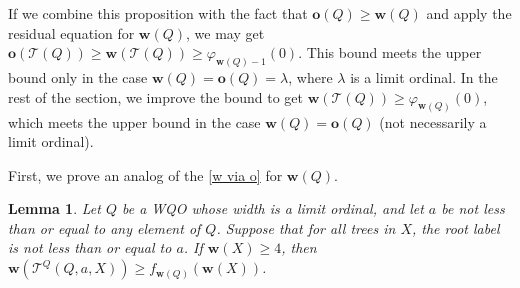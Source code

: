 \documentclass[runningheads]{llncs}
\let \geq \geqslant
\let \phi \varphi
\def \T {\mathcal{T}}
\def \o {\textbf{o}}
\def \w {\textbf{w}}
\newtheorem{lemma}{Lemma}
\begin{document}
If we combine this proposition with the fact that $\o(Q) \geq \w(Q)$ and apply the residual equation for $\w(Q)$, we may get $\o(\T(Q)) \geq \w(\T(Q)) \geq \phi_{\w(Q)-1}(0)$. This bound meets the upper bound only in the case $\w(Q) = \o(Q) = \lambda$, where $\lambda$ is a limit ordinal. In the rest of the section, we improve the bound to get $\w(\T(Q)) \geq \phi_{\w(Q)}(0)$, which meets the upper bound in the case $\w(Q) = \o(Q)$ (not necessarily a limit ordinal).

First, we prove an analog of the \cref{w via o} for $\w(Q)$.

\begin{lemma}
    Let $Q$ be a WQO whose width is a limit ordinal, and let $a$ be not less than or equal to any element of $Q$.
    Suppose that for all trees in $X$, the root label is not less than or equal to $a$.
    If $\w(X) \geq 4$, then $\w(\T^Q(Q, a, X)) \geq f_{\w(Q)}(\w(X))$.
\end{lemma}
\end{document}
